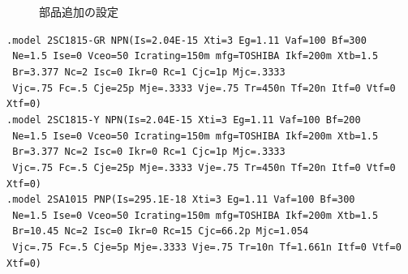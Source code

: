 \begin{enumerate}
\begin{itemize}
      \begin{figure}[htb]
        \begin{center}
        \caption{部品追加の設定}
        \end{center}
      \end{figure}
    \end{itemize}
\verb|.model 2SC1815-GR NPN(Is=2.04E-15 Xti=3 Eg=1.11 Vaf=100 Bf=300|\\
\verb| Ne=1.5 Ise=0 Vceo=50 Icrating=150m mfg=TOSHIBA Ikf=200m Xtb=1.5|\\
\verb| Br=3.377 Nc=2 Isc=0 Ikr=0 Rc=1 Cjc=1p Mjc=.3333| \\
\verb| Vjc=.75 Fc=.5 Cje=25p Mje=.3333 Vje=.75 Tr=450n Tf=20n Itf=0 Vtf=0 Xtf=0)|\\
\verb|.model 2SC1815-Y NPN(Is=2.04E-15 Xti=3 Eg=1.11 Vaf=100 Bf=200|\\
\verb| Ne=1.5 Ise=0 Vceo=50 Icrating=150m mfg=TOSHIBA Ikf=200m Xtb=1.5|\\
\verb| Br=3.377 Nc=2 Isc=0 Ikr=0 Rc=1 Cjc=1p Mjc=.3333|\\
\verb| Vjc=.75 Fc=.5 Cje=25p Mje=.3333 Vje=.75 Tr=450n Tf=20n Itf=0 Vtf=0 Xtf=0)|\\
\verb|.model 2SA1015 PNP(Is=295.1E-18 Xti=3 Eg=1.11 Vaf=100 Bf=300|\\ 
\verb| Ne=1.5 Ise=0 Vceo=50 Icrating=150m mfg=TOSHIBA Ikf=200m Xtb=1.5|\\
\verb| Br=10.45 Nc=2 Isc=0 Ikr=0 Rc=15 Cjc=66.2p Mjc=1.054|\\
\verb| Vjc=.75 Fc=.5 Cje=5p Mje=.3333 Vje=.75 Tr=10n Tf=1.661n Itf=0 Vtf=0 Xtf=0)|\\

\end{enumerate}
